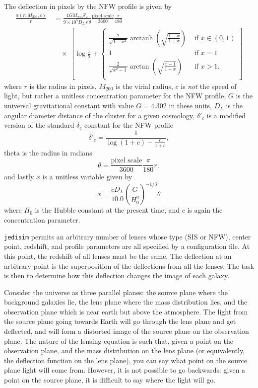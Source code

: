 \documentclass[10pt,twoside]{article}
\theoremstyle{definition}
\theoremstyle{exercise}
\begin{document}
\begin{description}
    The deflection in pixels by the NFW profile is given by
    \begin{align}
      \nonumber
      \frac{\alpha(r; M_{200}, c)}{r} \ &=  \frac{4GM_{200}\delta'_c}{9\times 10^5 D_L\, r\, \theta }\frac{\text{pixel scale}}{3600}\frac{\pi}{180}\\
      \ & \quad \times\
\left[\log \frac{x}{2} +  
      \begin{cases}
        \frac{2}{\sqrt{1-x^2}}\operatorname{arctanh}\left( \sqrt{\frac{1-x}{1+x}} \right) & \text{ if $x \in (0, 1)$}\\
        1 & \text{ if $x=1$}\\
        \frac{2}{\sqrt{x^2-1}}\arctan\left( \sqrt{\frac{x-1}{1+x}} \right) & \text{ if $x > 1$.}\\
      \end{cases}
      \right]
      \label{eq:NFW_deflection}
    \end{align}
    where $r$ is the radius in pixels, $M_{200}$ is the virial radius, $c$ is \textit{not} the speed of light, but rather a unitless concentration parameter for the NFW profile, $G$ is the universal gravitational constant with value $G = 4.302$ in these units, $D_L$ is the angular diameter distance of the cluster for a given cosmology, $\delta'_c$ is a modified version of the standard $\delta_c$ constant for the NFW profile 
    \[
      \delta'_c = \frac{1}{\log(1+c)-\frac{c}{1+c}},
    \]
    theta is the radius in radians 
    \[
      \theta = \frac{\text{pixel scale}}{3600}\frac{\pi}{180} r,
    \]
    and lastly $x$ is a unitless variable given by
    \[
      x = \frac{c D_L}{10.0}\left(\frac{G}{H_0^2}\right)^{-1/3}\theta
    \]
    where $H_0$ is the Hubble constant at the present time, and $c$ is again the concentration parameter.
\end{description}

\texttt{jedisim} permits an arbitrary number of lenses whose type (SIS or NFW), center point, redshift, and profile parameters are all specified by a configuration file. At this point, the redshift of all lenses must be the same. The deflection at an arbitrary point is the superposition of the deflections from all the lenses. The task is then to determine how this deflection changes the image of each galaxy.

Consider the universe as three parallel planes: the source plane where the background galaxies lie, the lens plane where the mass distribution lies, and the observation plane which is near earth but above the atmosphere. The light from the source plane going towards Earth will go through the lens plane and get deflected, and will form a distorted image of the source plane on the observation plane. The nature of the lensing equation is such that, given a point on the observation plane, and the mass distribution on the lens plane (or equivalently, the deflection function on the lens plane), you can say what point on the source plane light will come from. However, it is not possible to go backwards: given a point on the source plane, it is difficult to say where the light will go. 
\end{document}
